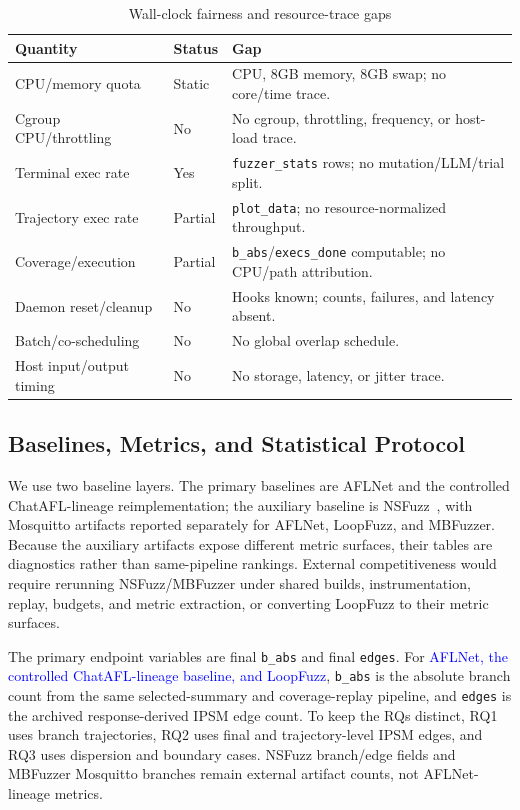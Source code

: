 \documentclass[final,5p,times,number]{elsarticle}
\begin{document}
\begin{table}[!t]
\centering
\caption{Wall-clock fairness and resource-trace gaps}
\label{tab:wallclock_resource_status}
{\scriptsize
\setlength{\tabcolsep}{3.6pt}
\renewcommand{\arraystretch}{1.05}
\begin{tabularx}{0.88\textwidth}{>{\raggedright\arraybackslash}p{}
>{\centering\arraybackslash}p{}
>{\raggedright\arraybackslash}X}
\toprule
Quantity & Status & Gap \\
\midrule
CPU/memory quota & Static & 1 CPU, 8GB memory, 8GB swap; no core/time trace. \\
Cgroup CPU/throttling & No & No cgroup, throttling, frequency, or host-load trace. \\
Terminal exec rate & Yes & \texttt{fuzzer\_stats} rows; no mutation/LLM/trial split. \\
Trajectory exec rate & Partial & \texttt{plot\_data}; no resource-normalized throughput. \\
Coverage/execution & Partial & \texttt{b\_abs}/\texttt{execs\_done} computable; no CPU/path attribution. \\
Daemon reset/cleanup & No & Hooks known; counts, failures, and latency absent. \\
Batch/co-scheduling & No & No global overlap schedule. \\
Host input/output timing & No & No storage, latency, or jitter trace. \\
\bottomrule
\end{tabularx}
}
\end{table}

\subsection{Baselines, Metrics, and Statistical Protocol}
We use two baseline layers. The primary baselines are AFLNet and the controlled ChatAFL-lineage reimplementation; the auxiliary baseline is NSFuzz~\cite{nsfuzz}, with Mosquitto artifacts reported separately for AFLNet, LoopFuzz, and MBFuzzer. Because the auxiliary artifacts expose different metric surfaces, their tables are diagnostics rather than same-pipeline rankings. External competitiveness would require rerunning NSFuzz/MBFuzzer under shared builds, instrumentation, replay, budgets, and metric extraction, or converting LoopFuzz to their metric surfaces.

The primary endpoint variables are final \texttt{b\_abs} and final \texttt{edges}. For \textcolor{blue}{AFLNet, the controlled ChatAFL-lineage baseline, and LoopFuzz}, \texttt{b\_abs} is the absolute branch count from the same selected-summary and coverage-replay pipeline, and \texttt{edges} is the archived response-derived IPSM edge count. To keep the RQs distinct, RQ1 uses branch trajectories, RQ2 uses final and trajectory-level IPSM edges, and RQ3 uses dispersion and boundary cases. NSFuzz branch/edge fields and MBFuzzer Mosquitto branches remain external artifact counts, not AFLNet-lineage metrics.
\end{document}
